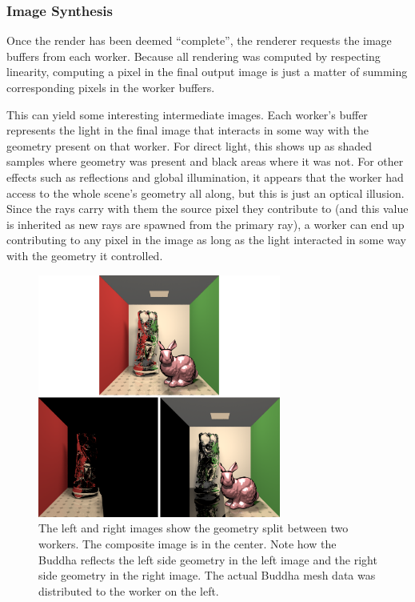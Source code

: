 \documentclass[a4paper,twoside]{article}
\begin{document}
\subsubsection{Image Synthesis}
\label{synthesis}

Once the render has been deemed ``complete'', the renderer requests the image
buffers from each worker. Because all rendering was computed by respecting
linearity, computing a pixel in the final output image is just a matter
of summing corresponding pixels in the worker buffers.

This can yield some interesting intermediate images. Each worker's buffer
represents the light in the final image that interacts in some way with the
geometry present on that worker. For direct light, this shows up as shaded samples where geometry was present
and black areas where it was not. For other effects such as reflections and
global illumination, it appears that the worker had access to the whole scene's
geometry all along, but this is just an optical illusion. Since the rays
carry with them the source pixel they contribute to (and this value is inherited
as new rays are spawned from the primary ray), a worker can end up contributing
to any pixel in the image as long as the light interacted in some way with the
geometry it controlled.

\begin{figure}[h!]
    \centering
    \includegraphics[width=80mm]{images/linearity.png}
    \caption{The left and right images show the geometry split between two workers. The composite image is in the center. Note how the Buddha reflects the left side geometry in the left image and the right side geometry in the right image. The actual Buddha mesh data was distributed to the worker on the left.}
    \label{fig:linearity}
\end{figure}
\end{document}
